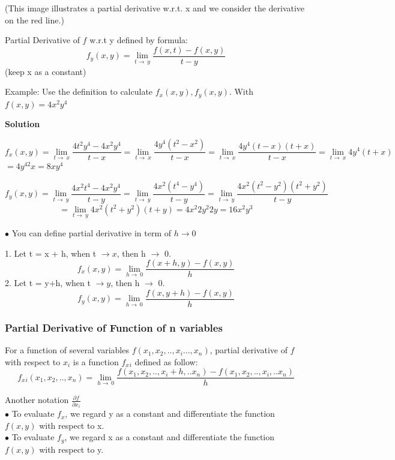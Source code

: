 \documentclass[12pt]{article}
\begin{document}
 
(This image illustrates a partial derivative w.r.t. x and we consider the derivative on the red line.) 
\begin{mybox}
    Partial Derivative of $f$ w.r.t y defined by formula: 
  $$f_y (x,y) = \lim_{t \to \ y} \frac{f(x,t) - f(x,y)}{t-y}$$ (keep x as a constant)
  
\end{mybox}

 Example: Use the definition to calculate $f_x(x,y),f_y(x,y)$. With $f(x,y) = 4x^2y^4$   
 \begin{center}
     \textbf{Solution}
 \end{center}
$$ f_x(x,y) = \lim_{t \to\ x} \frac{4t^2y^4 - 4x^2y^4}{t-x} =\lim_{t \to\ x} \frac{4y^4(t^2-x^2)}{t-x} = \lim_{t \to\ x} \frac{4y^4(t-x)(t+x)}{t-x} = \lim_{t \to\ x} 4y^4(t+x) $$
$= 4y^42x =8xy^4$

$$ f_y(x,y) = \lim_{t \to\ y} \frac{4x^2t^4 - 4x^2y^4}{t-y} =\lim_{t \to\ y} \frac{4x^2(t^4-y^4)}{t-y} = \lim_{t \to\ y} \frac{4x^2(t^2-y^2)(t^2+y^2)}{t-y}  $$
$$= \lim_{t \to\ y} 4x^2(t^2+y^2)(t+y) = 4x^2 2y^2 2y =16x^2y^3 $$

$\bullet$ You can define partial derivative in term of $h \rightarrow 0$

1. Let t = x + h, when t $\rightarrow x$, then h $\rightarrow$ 0.\\
$$f_x(x,y) = \lim_{h\to\ 0} \frac{f(x+h,y)- f(x,y)}{h}$$
2. Let t = y+h,  when t $\rightarrow y$, then h $\rightarrow$ 0.\\
$$f_y(x,y) = \lim_{h\to\ 0} \frac{f(x,y+h)- f(x,y)}{h}$$
\subsubsection{ Partial Derivative of Function of n variables}
\begin{mybox}
    For a function of several variables $f(x_1,x_2,..,x_i...,x_n)$, partial derivative of $f$ with respect to $x_i$ is a function $f_x{}_i$ defined as follow:
  $$f_x{}_i (x_1,x_2,..,x_n) = \lim_{h \to \ 0} \frac{f(x_1,x_2,..,x_i+h,..x_n) - f(x_1,x_2,..,x_i,..x_n)}{h}$$
    
    
\end{mybox}

Another notation $\frac{\partial f}{\partial x_i}$\\
$\bullet$ To evaluate $f_x$, we regard y as a constant and differentiate
the function $f(x, y)$ with respect to x.\\
$\bullet$ To evaluate $f_y$, we regard x as a constant and differentiate
the function $f(x, y)$ with respect to y.\\
\end{document}
